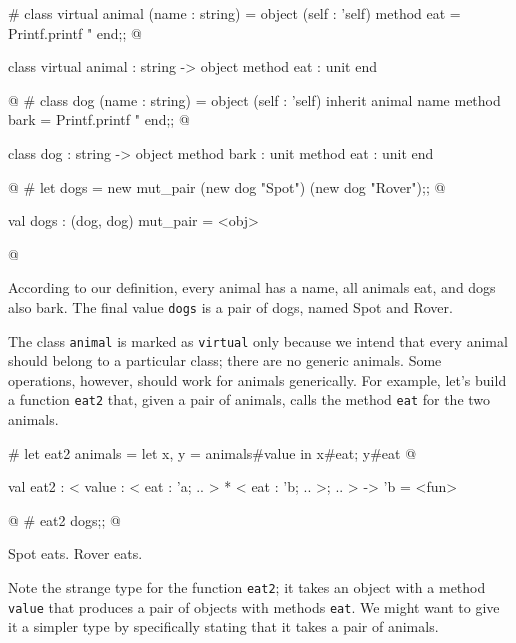 \begin{ocaml}
# class virtual animal (name : string) =
    object (self : 'self)
      method eat = Printf.printf "%
    end;;
@
\begin{topoutput}
class virtual animal : string -> object method eat : unit end
\end{topoutput}
@
# class dog (name : string) =
    object (self : 'self)
      inherit animal name
      method bark = Printf.printf "%
    end;;
@
\begin{topoutput}
class dog : string -> object method bark : unit method eat : unit end
\end{topoutput}
@
# let dogs = new mut_pair (new dog "Spot") (new dog "Rover");;
@
\begin{topoutput}
val dogs : (dog, dog) mut_pair = <obj>
\end{topoutput}
@
\end{ocaml}
%
According to our definition, every animal has a name, all animals eat, and
dogs also bark.  The final value \hbox{\lstinline$dogs$} is a pair of dogs,
named Spot and Rover.

The class \hbox{\lstinline$animal$} is marked as \hbox{\lstinline$virtual$} only
because we intend that every animal should belong to a particular
class; there are no generic animals.  Some operations, however,
should work for animals generically.  For example, let's build a
function \hbox{\lstinline$eat2$} that, given a pair of animals, calls
the method \hbox{\lstinline$eat$} for the two animals.

\begin{ocaml}
# let eat2 animals =
     let x, y = animals#value in x#eat; y#eat
@
\begin{topoutput}
val eat2 :
  < value : < eat : 'a; .. > * < eat : 'b; .. >; .. > -> 'b = <fun>
\end{topoutput}
@
# eat2 dogs;;
@
\begin{topoutput}
Spot eats.
Rover eats.
\end{topoutput}
\end{ocaml}
%
Note the strange type for the function \hbox{\lstinline$eat2$}; it takes
an object with a method \hbox{\lstinline$value$} that produces a pair of
objects with methods \hbox{\lstinline$eat$}.  We might want to
give it a simpler type by specifically stating that it takes a pair
of animals.


